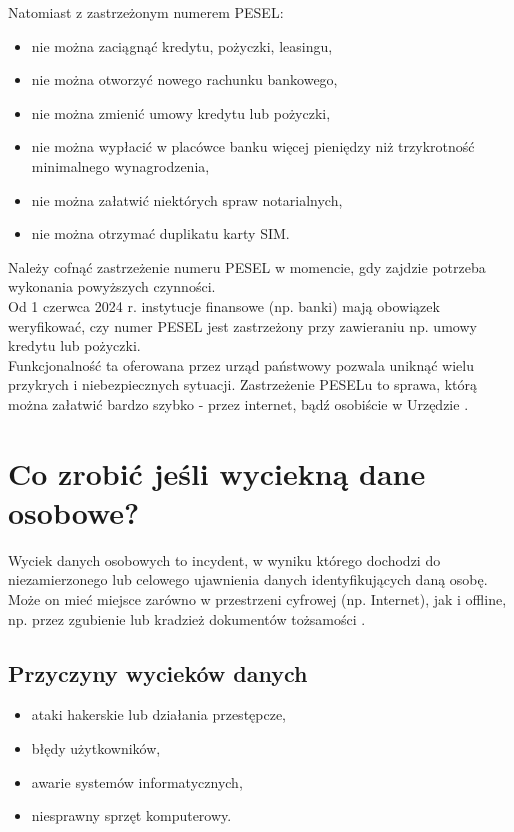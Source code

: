 Natomiast z zastrzeżonym numerem PESEL:
\begin{itemize}
    \item nie można zaciągnąć kredytu, pożyczki, leasingu,
    \item nie można otworzyć nowego rachunku bankowego,
    \item nie można zmienić umowy kredytu lub pożyczki,
    \item nie można wypłacić w placówce banku więcej pieniędzy niż trzykrotność minimalnego wynagrodzenia,
    \item nie można załatwić niektórych spraw notarialnych,
    \item nie można otrzymać duplikatu karty SIM.
\end{itemize}

Należy cofnąć zastrzeżenie numeru PESEL w momencie, gdy zajdzie potrzeba wykonania powyższych czynności.\\
Od 1 czerwca 2024 r. instytucje finansowe (np. banki) mają obowiązek weryfikować, czy numer PESEL jest zastrzeżony przy zawieraniu np. umowy kredytu lub pożyczki.\\
Funkcjonalność ta oferowana przez urząd państwowy pozwala uniknąć wielu przykrych i niebezpiecznych sytuacji. Zastrzeżenie PESELu to sprawa, którą można załatwić bardzo szybko - przez internet, bądź osobiście w Urzędzie \cite{pesel}.

\section{Co zrobić jeśli wyciekną dane osobowe?}

Wyciek danych osobowych to incydent, w wyniku którego dochodzi do niezamierzonego lub celowego ujawnienia danych identyfikujących daną osobę. Może on mieć miejsce zarówno w przestrzeni cyfrowej (np. Internet), jak i offline, np. przez zgubienie lub kradzież dokumentów tożsamości \cite{WYCIEK}.

\subsection{Przyczyny wycieków danych}
\begin{itemize}
    \item ataki hakerskie lub działania przestępcze,
    \item błędy użytkowników,
    \item awarie systemów informatycznych,
    \item niesprawny sprzęt komputerowy.
\end{itemize}

